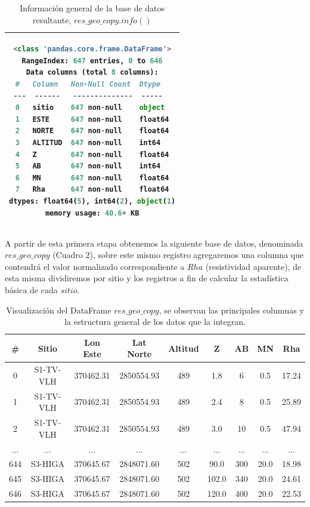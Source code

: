 \documentclass[sn-mathphys,Numbered]{sn-jnl}%
\theoremstyle{thmstyleone}%
\theoremstyle{thmstyletwo}%
\theoremstyle{thmstylethree}%
\begin{document}
\begin{table}[t]
\begin{center}
	\begin{tabular}{|c|}
			\hline
\begin{lstlisting}[language=python]
<class 'pandas.core.frame.DataFrame'>
RangeIndex: 647 entries, 0 to 646
Data columns (total 8 columns):
#   Column   Non-Null Count  Dtype  
---  ------   --------------  -----  
0   sitio    647 non-null    object 
1   ESTE     647 non-null    float64
2   NORTE    647 non-null    float64
3   ALTITUD  647 non-null    int64  
4   Z        647 non-null    float64
5   AB       647 non-null    int64  
6   MN       647 non-null    float64
7   Rha      647 non-null    float64
dtypes: float64(5), int64(2), object(1)
memory usage: 40.6+ KB
\end{lstlisting}\\
		\hline
\end{tabular}
\caption{Información general de la base de datos resultante, $res\_geo\_copy.info()$}
\label{tab:info}
\end{center}
\end{table}

A partir de esta primera etapa obtenemos la siguiente base de datos, denominada $res\_geo\_copy$ (Cuadro 2), sobre este mismo registro agregaremos una columna que contendrá el valor normalizado correspondiente a $Rha$ (resistividad aparente), de esta misma dividiremos por sitio y los registros a fin de calcular la estadística básica de cada $sitio$.

\begin{table}[t]
	\begin{center}
	\begin{tabular}{|c|c|c|c|c|c|c|c|c|}
		\hline
		\#&Sitio & Lon Este & Lat Norte & Altitud & Z & AB & MN & Rha \\
		\hline
		0&S1-TV-VLH&	370462.31&	2850554.93&	489&	1.8&	6&	0.5&	17.24\\	
		1&S1-TV-VLH&	370462.31&	2850554.93&	489&	2.4&	8&	0.5&	25.89\\
		2&S1-TV-VLH&	370462.31&	2850554.93&	489&	3.0&	10&	0.5&	47.94 \\
		...& ... &...  &...  &...  &...  &...  &...  &...  \\
		644&	S3-HIGA&	370645.67&	2848071.60&	502&	90.0&	300&	20.0&	18.98  \\
		645&	S3-HIGA&	370645.67&	2848071.60&	502&	102.0&	340&	20.0&	24.61 \\
		646&	S3-HIGA&	370645.67&	2848071.60&	502&	120.0&	400&	20.0&	22.53 \\
		\hline
	\end{tabular}
	\caption{Visualización del DataFrame $res\_geo\_copy$, se observan las principales columnas y la estructura general de los datos que la integran.}
	\label{tab:dataframe}
	\end{center}
\end{table}
\end{document}
